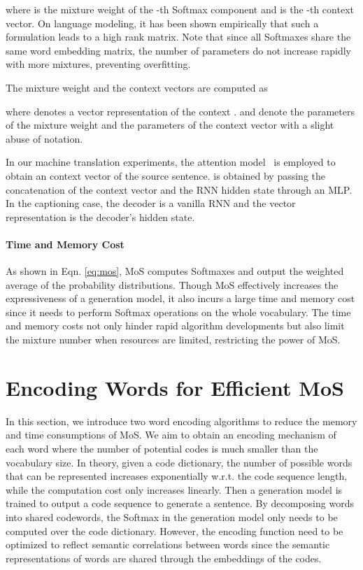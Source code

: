 \documentclass[letterpaper]{article} \usepackage{aaai19}  \usepackage{times}  \usepackage{helvet}  \usepackage{courier}  \usepackage{url}  \usepackage{graphicx}  \frenchspacing  \usepackage{booktabs}
\begin{document}
where  is the mixture weight of the -th Softmax component and  is the -th context vector. On language modeling, it has been shown empirically that such a formulation leads to a high rank matrix. Note that since all Softmaxes share the same word embedding matrix, the number of parameters do not increase rapidly with more mixtures, preventing overfitting.

The mixture weight and the context vectors are computed as 

where  denotes a vector representation of the context .  and  denote the parameters of the mixture weight and the parameters of the context vector with a slight abuse of notation. 

In our machine translation experiments, the attention model~\cite{bahdanau2014neural} is employed to obtain an context vector of the source sentence.  is obtained by passing the concatenation of the context vector and the RNN hidden state through an MLP.  
In the captioning case, the decoder is a vanilla RNN and the vector representation  is the decoder's hidden state. 

\paragraph{Time and Memory Cost} As shown in Eqn. \ref{eq:mos}, MoS computes  Softmaxes and output the weighted average of the  probability distributions. Though MoS effectively increases the expressiveness of a generation model, it also incurs a large time and memory cost since it needs to perform  Softmax operations on the whole vocabulary. The time and memory costs not only hinder rapid algorithm developments but also limit the mixture number when resources are limited, restricting the power of MoS.

\section{Encoding Words for Efficient MoS}
In this section, we introduce two word encoding algorithms to reduce the memory and time consumptions of MoS. 
We aim to obtain an encoding mechanism of each word where the number of potential codes is much smaller than the vocabulary size. In theory, given a code dictionary, the number of possible words that can be represented increases exponentially w.r.t. the code sequence length, while the computation cost only increases linearly.
Then a generation model is trained to output a code sequence to generate a sentence. By decomposing words into shared codewords, the Softmax in the generation model only needs to be computed over the code dictionary. However, the encoding function need to be optimized to reflect semantic correlations between words since the semantic representations of words are shared through the embeddings of the codes. 
\end{document}
